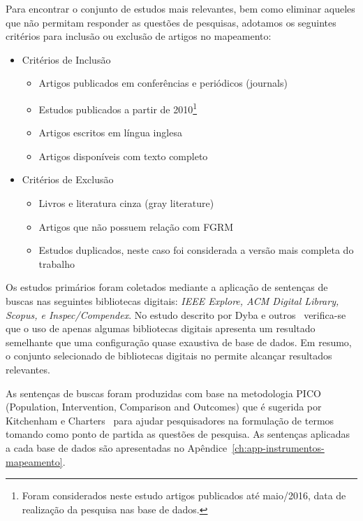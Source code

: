 Para encontrar o conjunto de estudos mais relevantes, bem como eliminar aqueles
que não permitam responder as questões de pesquisas, adotamos os seguintes
critérios para inclusão ou exclusão de artigos no mapeamento:

\begin{itemize}
	\item Critérios de Inclusão
		\begin{itemize}
			\item Artigos
				publicados em conferências e periódicos (journals)
			\item Estudos
				publicados a partir de 2010\footnote{Foram considerados neste
					estudo artigos publicados até maio/2016, data de realização
					da pesquisa nas base de dados.}
			\item Artigos escritos em
				língua inglesa
			\item Artigos disponíveis com texto
				completo
		\end{itemize}
	\item Critérios de Exclusão
		\begin{itemize}
			\item Livros e literatura cinza (gray literature)
			\item Artigos que não possuem relação com FGRM
			\item Estudos duplicados, neste caso foi considerada a versão mais
				completa do trabalho
		\end{itemize}
\end{itemize}

Os estudos primários foram coletados mediante a aplicação de sentenças de buscas
nas seguintes bibliotecas digitais: \textit{IEEE Explore, ACM Digital Library,
	Scopus, e Inspec/Compendex}. No estudo descrito por Dyba e
outros~\cite{dybaa2007applying} verifica-se que o uso de apenas algumas
bibliotecas digitais apresenta um resultado semelhante que uma configuração
quase exaustiva de base de dados. Em resumo, o conjunto selecionado de
bibliotecas digitais no permite alcançar resultados relevantes.

As sentenças de buscas foram produzidas com base na metodologia PICO
(Population, Intervention, Comparison and Outcomes) que é sugerida por
Kitchenham e Charters~\cite{keele2007guidelines} para ajudar pesquisadores na
formulação de termos tomando como ponto de partida as questões de pesquisa. As
sentenças aplicadas a cada base de dados são apresentadas no
Apêndice~\ref{ch:app-instrumentos-mapeamento}.

